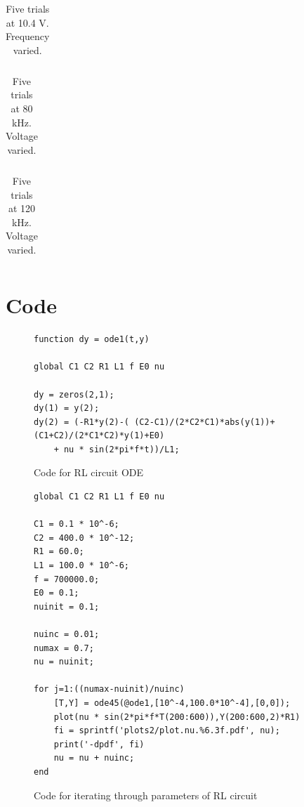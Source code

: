 \documentclass[12pt]{report}
\begin{document}
	\begin{table}[h]
		\centering
		\begin{tabular}{|c|c|c|c|c|}
			\hline
			 
		\end{tabular}
		\caption{Five trials at 10.4 V. Frequency varied.}
		\label{tab:chaos3.10.4}
	\end{table}

	\begin{table}[h] 
		\centering
		\begin{tabular}{|l|l|l|l|l|l|l|l|l|l|l|l|}
			\hline
			 
		\end{tabular}
		\caption{Five trials at 80 kHz. Voltage varied.}
		\label{tab:chaos2.80khz}
	\end{table}
	
	\begin{table}[h]
		\centering
		\begin{tabular}{|l|l|l|l|l|l|l|l|l|l|l|l|}
			\hline
			 
		\end{tabular}
		\caption{Five trials at 120 kHz. Voltage varied.}
		\label{tab:chaos2.100khz}
	\end{table}

\section{Code}
\label{sec: Code}

\begin{figure}[h]
\begin{lstlisting}
function dy = ode1(t,y)

global C1 C2 R1 L1 f E0 nu

dy = zeros(2,1);
dy(1) = y(2);
dy(2) = (-R1*y(2)-( (C2-C1)/(2*C2*C1)*abs(y(1))+ (C1+C2)/(2*C1*C2)*y(1)+E0)
	+ nu * sin(2*pi*f*t))/L1;
\end{lstlisting}
\caption{Code for RL circuit ODE}
\label{code:ode}
\end{figure}

\begin{figure}[h]
\begin{lstlisting}
global C1 C2 R1 L1 f E0 nu

C1 = 0.1 * 10^-6;
C2 = 400.0 * 10^-12;
R1 = 60.0;
L1 = 100.0 * 10^-6;
f = 700000.0;
E0 = 0.1;
nuinit = 0.1;

nuinc = 0.01;
numax = 0.7;
nu = nuinit;

for j=1:((numax-nuinit)/nuinc)
    [T,Y] = ode45(@ode1,[10^-4,100.0*10^-4],[0,0]);
    plot(nu * sin(2*pi*f*T(200:600)),Y(200:600,2)*R1)
    fi = sprintf('plots2/plot.nu.%6.3f.pdf', nu);
    print('-dpdf', fi)
    nu = nu + nuinc;
end
\end{lstlisting}
	\caption{Code for iterating through parameters of RL circuit}
	\label{code:run}
\end{figure}



\end{document}
